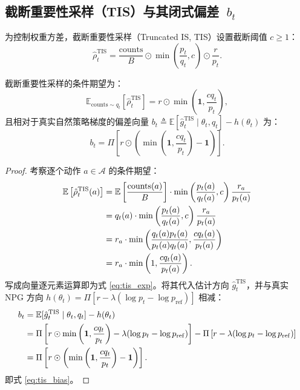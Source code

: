 \documentclass[11pt, a4paper, UTF8]{ctexart}
\begin{document}
\subsection{截断重要性采样（TIS）与其闭式偏差~\texorpdfstring{$b_t$}{b_t}}

为控制权重方差，截断重要性采样（Truncated IS, TIS）设置截断阈值 $c \ge 1$：
\begin{equation}
    \hat{\rho}_t^{\mathrm{TIS}} = \frac{\mathrm{counts}}{B} \odot \min\left( \frac{p_t}{q_t}, c \right) \odot \frac{r}{p_t}.
\end{equation}

\begin{derivbox}
截断重要性采样的条件期望为：
\begin{equation}
    \mathbb{E}_{\mathrm{counts} \sim q_t}\left[ \hat{\rho}_t^{\mathrm{TIS}} \right] = r \odot \min\left( \mathbf{1}, \frac{c q_t}{p_t} \right),
    \label{eq:tis_exp}
\end{equation}
且相对于真实自然策略梯度的偏差向量 $b_t \triangleq \mathbb{E}[\hat{g}_t^{\mathrm{TIS}} \mid \theta_t, q_t] - h(\theta_t)$ 为：
\begin{equation}
    b_t = \Pi \left[ r \odot \left( \min\left( \mathbf{1}, \frac{c q_t}{p_t} \right) - \mathbf{1} \right) \right].
    \label{eq:tis_bias}
\end{equation}
\end{derivbox}

\begin{proof}
考察逐个动作 $a \in \mathcal{A}$ 的条件期望：
\begin{align}
    \mathbb{E} \left[ \hat{\rho}_t^{\mathrm{TIS}}(a) \right] &= \mathbb{E}\left[\frac{\mathrm{counts}(a)}{B}\right] \cdot \min\left( \frac{p_t(a)}{q_t(a)}, c \right) \frac{r_a}{p_t(a)} \notag \\
    &= q_t(a) \cdot \min\left( \frac{p_t(a)}{q_t(a)}, c \right) \frac{r_a}{p_t(a)} \notag \\
    &= r_a \cdot \min\left( \frac{q_t(a) p_t(a)}{p_t(a) q_t(a)}, \frac{c q_t(a)}{p_t(a)} \right) \notag \\
    &= r_a \cdot \min\left( 1, \frac{c q_t(a)}{p_t(a)} \right).
\end{align}
写成向量逐元素运算即为式 \eqref{eq:tis_exp}。将其代入估计方向 $\hat{g}_t^{\mathrm{TIS}}$，并与真实 NPG 方向 $h(\theta_t) = \Pi[r - \lambda(\log p_t - \log p_{\mathrm{ref}})]$ 相减：
\begin{align}
    b_t &= \mathbb{E}[\hat{g}_t^{\mathrm{TIS}} \mid \theta_t, q_t] - h(\theta_t) \notag \\
    &= \Pi \left[ r \odot \min\left( \mathbf{1}, \frac{c q_t}{p_t} \right) - \lambda(\log p_t - \log p_{\mathrm{ref}}) \right] - \Pi \left[ r - \lambda(\log p_t - \log p_{\mathrm{ref}}) \right] \notag \\
    &= \Pi \left[ r \odot \left( \min\left( \mathbf{1}, \frac{c q_t}{p_t} \right) - \mathbf{1} \right) \right].
\end{align}
即式 \eqref{eq:tis_bias}。
\end{proof}
\end{document}
